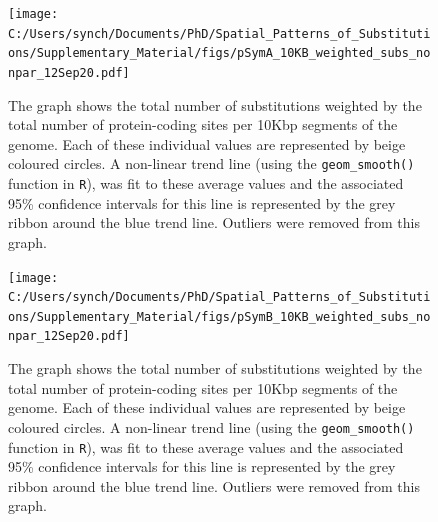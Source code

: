 \documentclass[12pt]{article}
\begin{document}
\begin{figure}[h]
	\begin{center}
		\texttt{[image: C:/Users/synch/Documents/PhD/Spatial\_Patterns\_of\_Substitutions/Supplementary\_Material/figs/pSymA\_10KB\_weighted\_subs\_nonpar\_12Sep20.pdf]}
		\caption{\label{fig:pSymA_nonpar}The graph shows the total number of substitutions weighted by the total number of protein-coding sites per 10Kbp segments of the genome. Each of these individual values are represented by beige coloured circles. A non-linear trend line (using the \texttt{geom\_smooth()} function in \texttt{R}), was fit to these average values and the associated 95\% confidence intervals for this line is represented by the grey ribbon around the blue trend line. Outliers were removed from this graph.}
	\end{center}
\end{figure}

\begin{figure}[h]
	\begin{center}
		\texttt{[image: C:/Users/synch/Documents/PhD/Spatial\_Patterns\_of\_Substitutions/Supplementary\_Material/figs/pSymB\_10KB\_weighted\_subs\_nonpar\_12Sep20.pdf]}
		\caption{\label{fig:pSymB_nonpar}The graph shows the total number of substitutions weighted by the total number of protein-coding sites per 10Kbp segments of the genome. Each of these individual values are represented by beige coloured circles. A non-linear trend line (using the \texttt{geom\_smooth()} function in \texttt{R}), was fit to these average values and the associated 95\% confidence intervals for this line is represented by the grey ribbon around the blue trend line. Outliers were removed from this graph.}
	\end{center}
\end{figure}



\end{document}
